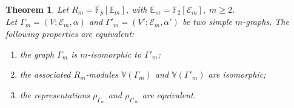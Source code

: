 \documentclass[preprint,12pt,authoryear]{elsarticle}
\newtheorem{thm}{Theorem}[section]
\theoremstyle{definition}
\begin{document}
\begin{thm} \label{graphEquivModules}
Let $R_m=\overline{\mathbb{F}}_p[\mathbb{E}_m]$, with  $\mathbb{E}_m=\mathbb{F}_2[\mathcal{E}_m], \; m \ge 2$.\\
 Let  $\Gamma_m=(V;\mathcal{E}_m, \alpha)$ and $\Gamma'_m=(V'; \mathcal{E}_m, \alpha')$ be two simple $m$-graphs. The following properties are equivalent:
\begin{enumerate}
\item[i)] the graph $\Gamma_m$ is $m$-isomorphic to  $\Gamma'_m$;
\item[ii)] the associated $R_m$-modules ${\displaystyle \mathbb{V}(\Gamma_m)}$ and ${\displaystyle \mathbb{V}(\Gamma'_m)}$ are isomorphic;
\item[iii)]  the representations $ \rho_{\Gamma_m}$ and $\rho_{\Gamma'_m}$  are equivalent.
\end{enumerate}
\end{thm}
\end{document}
